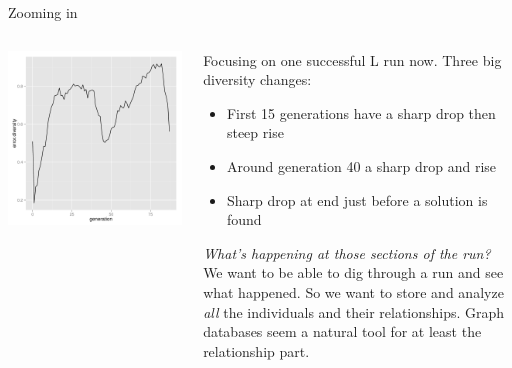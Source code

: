 \documentclass{beamer}
\newcommand{\linespace}{\vskip 0.25cm}
\begin{document}
\begin{frame}{Zooming in}
	
	\begin{columns}
		\begin{column}{0.55 \linewidth}
			\centering
			\includegraphics[width = \linewidth]{Figures/run6_lexicase_rswn_diversity.pdf}
		\end{column}
		
		\begin{column}{0.4 \linewidth}
			\begin{overprint}
				Focusing on one successful L run now.
				\linespace
				Three big diversity changes:
				\begin{itemize}
					\item First 15 generations have a sharp drop then steep rise
					\item Around generation 40 a sharp drop and rise
					\item Sharp drop at end just before a solution is found
				\end{itemize}
				
				\emph{What's happening at those sections of the run?}
				\linespace
				We want to be able to dig through a run and see what happened.
				\linespace
				So we want to store and analyze \emph{all} the individuals and their relationships.
				\linespace
				Graph databases seem a natural tool for at least the relationship part.
			\end{overprint}
		\end{column}
	\end{columns}
\end{frame}
\end{document}
